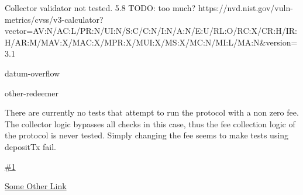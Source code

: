 \vuln
    { %
      Collector validator not tested.
    }
    { %
      5.8 TODO: too much?
    }
    { %
    https://nvd.nist.gov/vuln-metrics/cvss/v3-calculator?vector=AV:N/AC:L/PR:N/UI:N/S:C/C:N/I:N/A:N/E:U/RL:O/RC:X/CR:H/IR:H/AR:M/MAV:X/MAC:X/MPR:X/MUI:X/MS:X/MC:N/MI:L/MA:N&version=3.1
    }
    { %
    \item datum-overflow
    \item other-redeemer
    }
    { %
    There are currently no tests that attempt to run the protocol with a non zero fee. The collector logic bypasses all checks in this case, thus the fee collection logic of the protocol is never tested. Simply changing the fee seems to make tests using depositTx fail.
    }
    { %
      
    }
    { %
    \item\href{github.com}{\#1}
    \item\href{github.com}{Some Other Link}
    }
